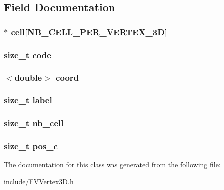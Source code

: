 \subsection{Field Documentation}
\hypertarget{classFVVertex3D_aa9ea4588d3e581ba9a3107b7b8a7f781}{
\subsubsection[{cell}]{$\ast$ {\bf cell}\mbox{[}NB\_\-CELL\_\-PER\_\-VERTEX\_\-3D\mbox{]}}}
\label{dc/d1d/classFVVertex3D_aa9ea4588d3e581ba9a3107b7b8a7f781}
\hypertarget{classFVVertex3D_acf258c3b3328a96e3ee1e3b875b7874f}{
\subsubsection[{code}]{\setlength{\rightskip}{0pt plus 5cm}size\_\-t {\bf code}}}
\label{dc/d1d/classFVVertex3D_acf258c3b3328a96e3ee1e3b875b7874f}
\hypertarget{classFVVertex3D_a1bb13d1bf241b2410a14697f8950f48a}{
\subsubsection[{coord}]{$<$double$>$ {\bf coord}}}
\label{dc/d1d/classFVVertex3D_a1bb13d1bf241b2410a14697f8950f48a}
\hypertarget{classFVVertex3D_a1ec973463c76e6d9e91160720959ad68}{
\subsubsection[{label}]{\setlength{\rightskip}{0pt plus 5cm}size\_\-t {\bf label}}}
\label{dc/d1d/classFVVertex3D_a1ec973463c76e6d9e91160720959ad68}
\hypertarget{classFVVertex3D_a1a5a11cfc8bbaa0cf132759c0382da70}{
\subsubsection[{nb\_\-cell}]{\setlength{\rightskip}{0pt plus 5cm}size\_\-t {\bf nb\_\-cell}}}
\label{dc/d1d/classFVVertex3D_a1a5a11cfc8bbaa0cf132759c0382da70}
\hypertarget{classFVVertex3D_a4a8207cde821dc3afcfb83f8645d62ef}{
\subsubsection[{pos\_\-c}]{\setlength{\rightskip}{0pt plus 5cm}size\_\-t {\bf pos\_\-c}}}
\label{dc/d1d/classFVVertex3D_a4a8207cde821dc3afcfb83f8645d62ef}


The documentation for this class was generated from the following file:\begin{DoxyCompactItemize}
\item 
include/\hyperlink{FVVertex3D_8h}{FVVertex3D.h}\end{DoxyCompactItemize}
